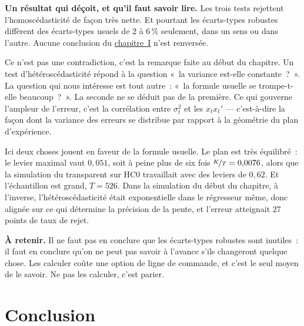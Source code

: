 \documentclass[10pt,a4paper]{article}
\newcommand{\siteurl}{https://le-mans.adjemian.eu/econometrics}
\newcommand{\chapref}[2]{\href{\siteurl/chapitre-#1.pdf}{chapitre~#2}}
\theoremstyle{definition}
\newcommand{\dnote}[1]{\begin{notebox}\footnotesize\textbf{À retenir. }#1\end{notebox}}
\begin{document}
\begin{notes}

  \textbf{Un résultat qui déçoit, et qu'il faut savoir lire.} Les trois tests
  rejettent l'homoscédasticité de façon très nette. Et pourtant les écarts-types
  robustes diffèrent des écarts-types usuels de $2$ à $6\,\%$ seulement, dans un
  sens ou dans l'autre. Aucune conclusion du \chapref{1}{I} n'est renversée.

  \bigskip

  Ce n'est pas une contradiction, c'est la remarque faite au début du chapitre.
  Un test d'hétéroscédasticité répond à la question «~la variance est-elle
  constante~?~». La question qui nous intéresse est tout autre~: «~la formule
  usuelle se trompe-t-elle beaucoup~?~». La seconde ne se déduit pas de la
  première. Ce qui gouverne l'ampleur de l'erreur, c'est la corrélation entre
  $\sigma_t^2$ et les $x_tx_t'$ — c'est-à-dire la façon dont la variance des
  erreurs se distribue par rapport à la géométrie du plan d'expérience.

  \bigskip

  Ici deux choses jouent en faveur de la formule usuelle. Le plan est très
  équilibré~: le levier maximal vaut $0{,}051$, soit à peine plus de six fois
  $\nicefrac{K}{T} = 0{,}0076$, alors que la simulation du transparent sur HC0
  travaillait avec des leviers de $0{,}62$. Et l'échantillon est grand,
  $T=526$. Dans la simulation du début du chapitre, à l'inverse,
  l'hétéroscédasticité était exponentielle dans le régresseur même, donc
  alignée sur ce qui détermine la précision de la pente, et l'erreur atteignait
  $27$ points de taux de rejet.

  \bigskip

  \dnote{Il ne faut pas en conclure que les écarts-types robustes sont inutiles~:
    il faut en conclure qu'on ne peut pas savoir à l'avance s'ils changeront
    quelque chose. Les calculer coûte une option de ligne de commande, et c'est
    le seul moyen de le savoir. Ne pas les calculer, c'est parier.}

\end{notes}


\section{Conclusion}
\end{document}
